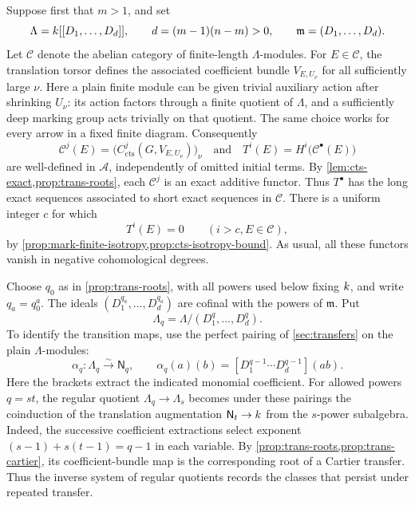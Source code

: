 Suppose first that $m>1$, and set
\[
 \Lambda=k[[D_1,\ldots,D_d]],\qquad d=(m-1)(n-m)>0,
 \qquad \mathfrak m=(D_1,\ldots,D_d).
\]
Let $\mathcal C$ denote the abelian category of finite-length
$\Lambda$-modules.  For $E\in\mathcal C$, the translation torsor
defines the associated coefficient bundle $V_{E,U_\nu}$ for all
sufficiently large $\nu$.  Here a plain finite module can be given
trivial auxiliary action after shrinking $U_\nu$: its action factors
through a finite quotient of $\Lambda$, and a sufficiently deep
marking group acts trivially on that quotient.  The same choice works
for every arrow in a fixed finite diagram.  Consequently
\[
 \mathcal C^j(E)
   =\bigl(C^j_{\mathrm{cts}}(G,V_{E,U_\nu})\bigr)_\nu
 \quad\text{and}\quad
 T^i(E)=H^i\bigl(\mathcal C^\bullet(E)\bigr)
\]
are well-defined in $\mathcal A$, independently of omitted initial
terms.  By \cref{lem:cts-exact,prop:trans-roots}, each $\mathcal C^j$
is an exact additive functor.  Thus $T^\bullet$ has the long exact
sequences associated to short exact sequences in $\mathcal C$.
There is a uniform integer $c$ for which
\begin{equation}
\label{eq:pro-degree-bound}
 T^i(E)=0\qquad(i>c, E\in\mathcal C),
\end{equation}
by \cref{prop:mark-finite-isotropy,prop:cts-isotropy-bound}.
As usual, all these functors vanish in negative cohomological degrees.

Choose $q_0$ as in \cref{prop:trans-roots}, with all powers used below
fixing $k$, and write $q_a=q_0^a$.  The ideals
$(D_1^{q_a},\ldots,D_d^{q_a})$ are cofinal with the powers of
$\mathfrak m$.  Put
\[
 \Lambda_q=\Lambda/(D_1^q,\ldots,D_d^q).
\]
To identify the transition maps, use the perfect pairing of
\cref{sec:transfers} on the plain $\Lambda$-modules:
\[
 \alpha_q:\Lambda_q\xrightarrow{\sim}\mathsf N_q,
 \qquad
 \alpha_q(a)(b)=
 [D_1^{q-1}\cdots D_d^{q-1}](ab).
\]
Here the brackets extract the indicated monomial coefficient.
For allowed powers $q=st$, the regular quotient $\Lambda_q\to\Lambda_s$ becomes
under these pairings the coinduction of the translation augmentation
$\mathsf N_t\to k$ from the $s$-power subalgebra. Indeed, the
successive coefficient extractions select exponent
$(s-1)+s(t-1)=q-1$ in each variable. By
\cref{prop:trans-roots,prop:trans-cartier}, its coefficient-bundle map
is the corresponding root of a Cartier transfer. Thus the inverse
system of regular quotients records the classes that persist under
repeated transfer.

